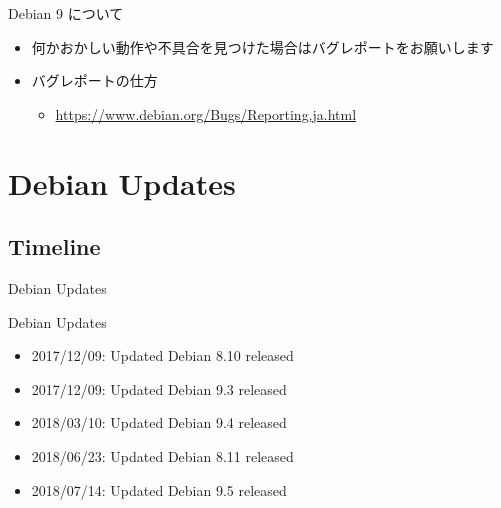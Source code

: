 \begin{frame}{Debian 9 について}%
  \begin{itemize}
  \item 何かおかしい動作や不具合を見つけた場合はバグレポートをお願いします
  \item バグレポートの仕方
    \begin{itemize}
    \item \url{https://www.debian.org/Bugs/Reporting.ja.html}
    \end{itemize}
  \end{itemize}
\end{frame}


\section{Debian Updates}

\subsection{Timeline}

\begin{frame}
  \begin{center}\Huge{Debian Updates}\end{center}
\end{frame}


\begin{frame}{Debian Updates}%

\begin{itemize}
  \item 2017/12/09:  Updated Debian 8.10 released
  \item 2017/12/09:  Updated Debian 9.3  released
  \item 2018/03/10:  Updated Debian 9.4  released
  \item 2018/06/23:  Updated Debian 8.11 released
  \item 2018/07/14:  Updated Debian 9.5  released
\end{itemize}

\end{frame}


